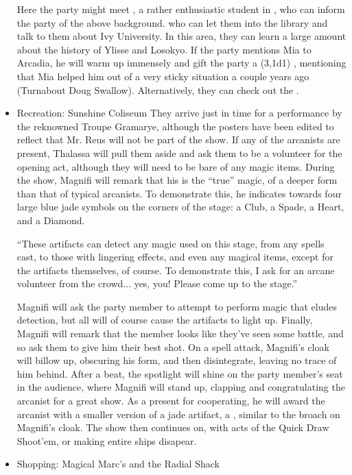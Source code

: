 \begin{itemize}
Here the party might meet , a rather enthusiastic student in , who can inform the party of the above background.  who can let them into the library and talk to them about Ivy University. In this area, they can learn a large amount about the history of Ylisse and Losokyo. If the party mentions Mia to Arcadia, he will warm up immensely and gift the party a (3,1d1) , mentioning that Mia helped him out of a very sticky situation a couple years ago (Turnabout Doug Swallow). Alternatively, they can check out the .
\item Recreation: Sunshine Coliseum
They arrive just in time for a performance by the reknowned Troupe Gramarye, although the posters have been edited to reflect that Mr. Reus will not be part of the show. If any of the arcanists are present, Thalassa will pull them aside and ask them to be a volunteer for the opening act, although they will need to be bare of any magic items. During the show, Magnifi will remark that his is the ``true'' magic, of a deeper form than that of typical arcanists. To demonstrate this, he indicates towards four large blue jade symbols on the corners of the stage: a Club, a Spade, a Heart, and a Diamond. 
\begin{center}
``These artifacts can detect any magic used on this stage, from any spells cast, to those with lingering effects, and even any magical items, except for the artifacts themselves, of course. To demonstrate this, I ask for an arcane volunteer from the crowd... yes, you! Please come up to the stage.''
\end{center}
Magnifi will ask the party member to attempt to perform magic that eludes detection, but all will of course cause the artifacts to light up. Finally, Magnifi will remark that the member looks like they've seen some battle, and so ask them to give him their best shot. On a spell attack, Magnifi's cloak will billow up, obscuring his form, and then disintegrate, leaving no trace of him behind. After a beat, the spotlight will shine on the party member's seat in the audience, where Magnifi will stand up, clapping and congratulating the arcanist for a great show. As a present for cooperating, he will award the arcanist with a smaller version of a jade artifact, a , similar to the broach on Magnifi's cloak. The show then continues on, with acts of the Quick Draw Shoot'em, or making entire ships disapear.

\item Shopping: Magical Marc's and the Radial Shack


\end{itemize}
